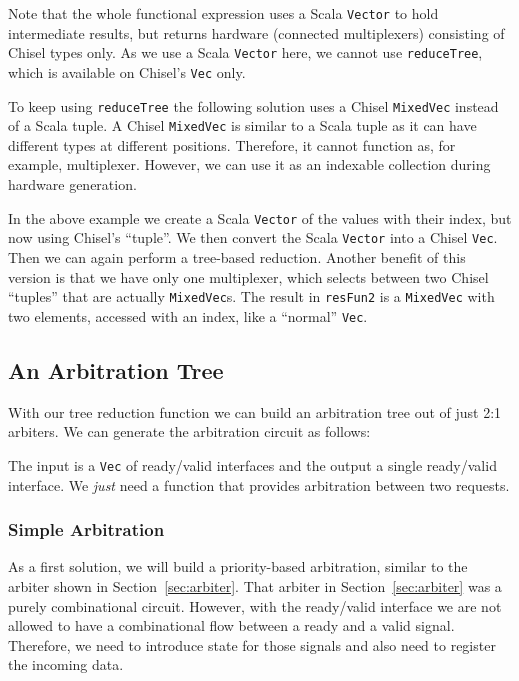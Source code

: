 \documentclass[%
    10pt,
    headinclude, footexclude,
    openright, %
    notitlepage,
    cleardoubleempty,
    headsepline,
    pointlessnumbers,
    bibtotoc, idxtotoc,
    ]{scrbook}
\newcommand{\code}[1]{{\lstinline[basicstyle=\small\ttfamily]{#1}}}
\begin{document}
Note that the whole functional expression uses a Scala \code{Vector} to hold intermediate results,
but returns hardware (connected multiplexers) consisting of Chisel types only.
As we use a Scala \code{Vector} here, we cannot use \code{reduceTree}, which is available on Chisel's
\code{Vec} only.

To keep using \code{reduceTree} the following solution uses a Chisel \code{MixedVec}
instead of a Scala tuple.
A Chisel \code{MixedVec} is similar to a Scala tuple as it can have different types at different positions.
Therefore, it cannot function as, for example, multiplexer. However, we can use it as an
indexable collection during hardware generation.



In the above example we create a Scala \code{Vector} of the values with their index, but now
using Chisel's ``tuple''. We then convert the Scala \code{Vector} into a Chisel \code{Vec}.
Then we can again perform a tree-based reduction. Another benefit of this version is
that we have only one multiplexer, which selects between two Chisel ``tuples'' that are actually
\code{MixedVec}s.
The result in \code{resFun2} is a \code{MixedVec} with two elements,
accessed with an index, like a ``normal'' \code{Vec}.

\subsection{An Arbitration Tree}
\label{sec:arbiter}

With our tree reduction function we can build an arbitration tree out of just 2:1 arbiters.
We can generate the arbitration circuit as follows:


\noindent The input is a \code{Vec} of ready/valid interfaces and the output a single ready/valid
interface. We \emph{just} need a function that provides arbitration between two requests.



\subsubsection{Simple Arbitration}

As a first solution, we will build a priority-based arbitration, similar to the arbiter shown
in Section~\ref{sec:arbiter}. That arbiter in Section~\ref{sec:arbiter} was a purely combinational circuit.
However, with the ready/valid interface we are not allowed to have a combinational
flow between a ready and a valid signal. Therefore, we need to introduce state for those signals
and also need to register the incoming data.
\end{document}
